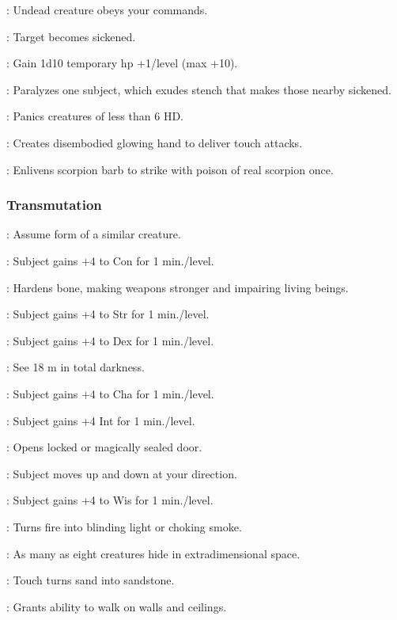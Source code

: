 	: Undead creature obeys your commands.

	: Target becomes sickened. %

	: Gain 1d10 temporary hp +1/level (max +10).

	: Paralyzes one subject, which exudes stench that makes those nearby sickened.

	: Panics creatures of less than 6 HD.

	: Creates disembodied glowing hand to deliver touch attacks.

	: Enlivens scorpion barb to strike with poison of real scorpion once. %

\subsubsection{Transmutation}
	: Assume form of a similar creature.

	: Subject gains +4 to Con for 1 min./level.

	: Hardens bone, making weapons stronger and impairing living beings. %

	: Subject gains +4 to Str for 1 min./level.

	: Subject gains +4 to Dex for 1 min./level.

	: See 18 m in total darkness.

	: Subject gains +4 to Cha for 1 min./level.

	: Subject gains +4 Int for 1 min./level.

	: Opens locked or magically sealed door.

	: Subject moves up and down at your direction.

	: Subject gains +4 to Wis for 1 min./level.

	: Turns fire into blinding light or choking smoke.

	: As many as eight creatures hide in extradimensional space.

	: Touch turns sand into sandstone. %

	: Grants ability to walk on walls and ceilings.

